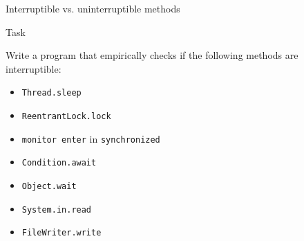 \begin{frame}[t]{Interruptible vs. uninterruptible methods}

\begin{homeworkmail}{Task~\taskCheckInterruptible}{
  Write a program that empirically checks if the following methods are interruptible:
  \begin{itemize}
    \item \texttt{Thread.sleep}
    \item \texttt{ReentrantLock.lock}
    \item \texttt{monitor enter} in \texttt{synchronized}
    \item \texttt{Condition.await}
    \item \texttt{Object.wait}
    \item \texttt{System.in.read}
    \item \texttt{FileWriter.write}
  \end{itemize}
}
\end{homeworkmail}


\end{frame}


